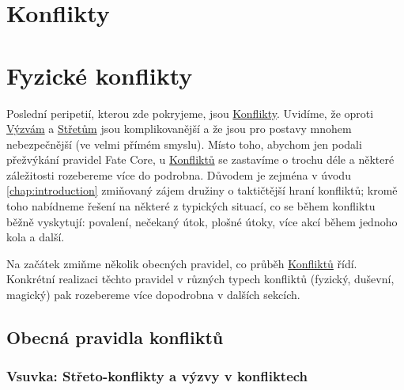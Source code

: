 \section{Konflikty}

\section{Fyzické konflikty}
\label{sec:boj}

Poslední peripetií, kterou zde pokryjeme, jsou \underline{Konflikty}. Uvidíme, že oproti \underline{Výzvám} a \underline{Střetům} jsou komplikovanější a že jsou pro postavy mnohem nebezpečnější (ve velmi přímém smyslu). Místo toho, abychom jen podali přežvýkání pravidel Fate Core, u \underline{Konfliktů} se zastavíme o trochu déle a některé záležitosti rozebereme více do podrobna. Důvodem je zejména v úvodu \ref{chap:introduction} zmiňovaný zájem družiny o taktičtější hraní konfliktů; kromě toho nabídneme řešení na některé z typických situací, co se během konfliktu běžně vyskytují: povalení, nečekaný útok, plošné útoky, více akcí během jednoho kola a další.

Na začátek zmiňme několik obecných pravidel, co průběh \underline{Konfliktů} řídí. Konkrétní realizaci těchto pravidel v různých typech konfliktů (fyzický, duševní, magický) pak rozebereme více dopodrobna v dalších sekcích.

\subsection{Obecná pravidla konfliktů}
\label{sec:obecna-pravidla}

\subsubsection{Vsuvka: Střeto-konflikty a výzvy v konfliktech}
\label{sec:hybrid}

